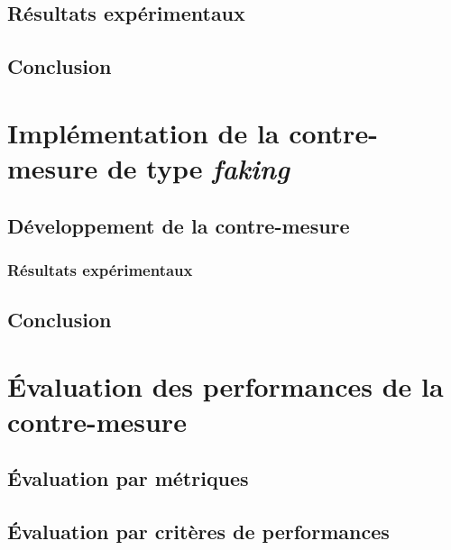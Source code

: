 \documentclass[oneside]{book}
\begin{document}
\section{Résultats expérimentaux}
\label{sec:Introduction}

\section{Conclusion}
\label{sec:Introduction}

\newpage


\chapter{Implémentation de la contre-mesure de type \textit{faking}}
\label{chap:faking}

\section{Développement de la contre-mesure}
\label{sec:Introduction}

\subsection{Résultats expérimentaux}
\label{sec:Introduction}

\section{Conclusion}
\label{sec:Introduction}

\newpage


\chapter{Évaluation des performances de la contre-mesure}

\section{Évaluation par métriques}
\label{sec:EvalMetrics}

\section{Évaluation par critères de performances}
\label{sec:EvalPerf}
\end{document}
